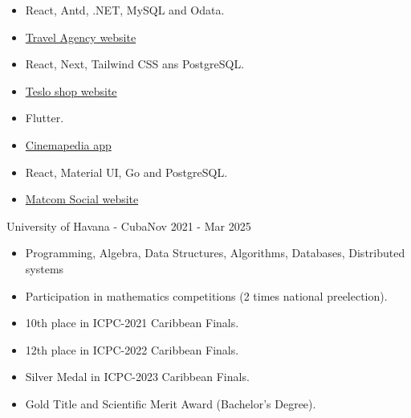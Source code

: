 



\begin{itemize}
	\item React, Antd, .NET, MySQL and Odata.
	\item \href{https://travel-agency-client.onrender.com/}{Travel Agency website}
\end{itemize}

\divider


\begin{itemize}
    \item React, Next, Tailwind CSS ans PostgreSQL.
    \item \href{https://teslo-shop-phi.vercel.app/}{Teslo shop website}
\end{itemize}

\divider


\begin{itemize}
    \item Flutter.
    \item \href{https://github.com/raudel25/cinemapedia_app/releases}{Cinemapedia app}
\end{itemize}

\divider


\begin{itemize}
    \item React, Material UI, Go and PostgreSQL.
    \item \href{https://social-network-client-6f8h.onrender.com/}{Matcom Social website}
\end{itemize}


{University of Havana - Cuba}{Nov 2021 - Mar 2025}{}
\begin{itemize}
    \item Programming, Algebra, Data Structures, Algorithms, Databases, Distributed systems
\end{itemize}


\begin{itemize}
    \item Participation in mathematics competitions (2 times national preelection).
    \item 10th place in ICPC-2021 Caribbean Finals.
    \item 12th place in ICPC-2022 Caribbean Finals.
    \item Silver Medal in ICPC-2023 Caribbean Finals.
    \item Gold Title and Scientific Merit Award (Bachelor's Degree).

\end{itemize}

